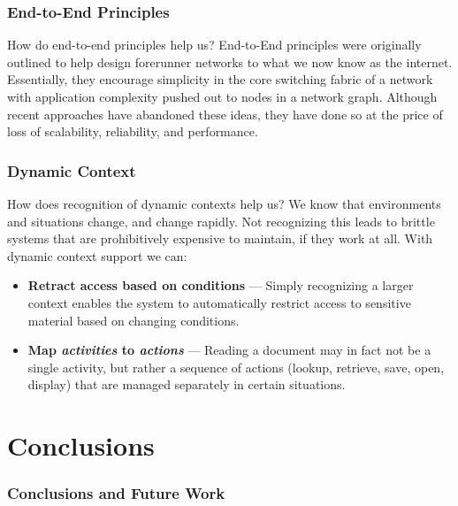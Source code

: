 \documentclass[t,handout, 10pt]{beamer}
\begin{document}
\begin{frame}
\frametitle{End-to-End Principles}
How do end-to-end principles help us?
\newline
\newline
\pause
End-to-End principles were originally outlined to help design forerunner networks to what we now know as the internet.
\newline
\newline
\pause
Essentially, they encourage simplicity in the core switching fabric of a network with application complexity pushed out to nodes in a network graph.
\newline
\newline
\pause
Although recent approaches have abandoned these ideas, they have done so at the price of loss of scalability, reliability, and performance.
\end{frame}

\begin{frame}
\frametitle{Dynamic Context}
How does recognition of dynamic contexts help us?
\newline
\newline
\pause
We know that environments and situations change, and change rapidly.  Not recognizing this leads to brittle systems that are prohibitively expensive to maintain, if they work at all.
\newline
\newline
\pause
With dynamic context support we can:
\begin{itemize}
\item \textbf{Retract access based on conditions} --- Simply recognizing a larger context enables the system to automatically restrict access to sensitive material based on changing conditions.
\pause
\item\textbf{Map \textit{activities} to \textit{actions}} --- Reading a document may in fact not be a single activity, but rather a sequence of actions (lookup, retrieve, save, open, display) that are managed separately in certain situations.
\end{itemize}
\end{frame}

\section{Conclusions}

\begin{frame}
\frametitle{Conclusions and Future Work}
\end{frame}
\end{document}

